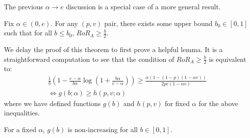 The previous $\alpha \rightarrow e$ discussion is a special case of a more general result.

\begin{theorem}
Fix $\alpha \in (0, e)$. For any $(p,v)$ pair, there exists some upper bound $b_0 \in [0,1]$ such that for all $b \leq b_0$, $RoR_A \geq \frac{b}{2}$.
\end{theorem}

We delay the proof of this theorem to first prove a helpful lemma. It is a straightforward computation to see that the condition of $RoR_A \geq \frac{b}{2}$ is equivalent to:
\begin{gather*}
\frac{1}{b}\left(1-\frac{e-\alpha}{b\alpha}\log \left(1+\frac{b\alpha}{e-\alpha} \right) \right) \geq \frac{\alpha(1-(1-p)(1-\alpha v))}{2pe(1-\alpha v)} \\
\iff
g(b; \alpha) \geq h(p, v; \alpha)
\end{gather*}
where we have defined functions $g(b)$ and $h(p,v)$ for fixed $\alpha$ for the above inequalities. 

\begin{lemma}
For a fixed $\alpha$, $g(b)$ is non-increasing for all $b \in [0,1]$. 
\end{lemma}

